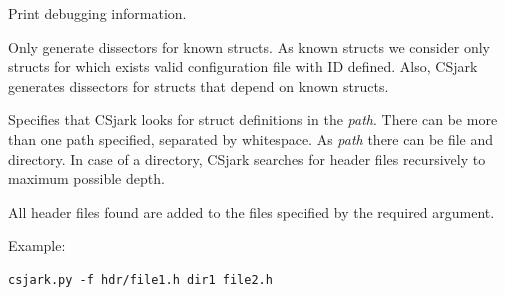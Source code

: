 \documentclass[A4paper,10pt,english]{sphinxmanual}
\begin{document}
\begin{fulllineitems}
\label{user/use:cmdoption-d}
Print debugging information.

\end{fulllineitems}


\begin{fulllineitems}
\label{user/use:cmdoption-s}
Only generate dissectors for known structs. As known structs we consider only structs for which exists valid configuration file with ID defined. Also, CSjark generates dissectors for structs that depend on known structs.

\end{fulllineitems}


\begin{fulllineitems}
\label{user/use:cmdoption-f}
Specifies that CSjark looks for struct definitions in the \emph{path}. There can be more than one path specified, separated by whitespace. As \emph{path} there can be file and directory. In case of a directory, CSjark searches for header files recursively to maximum possible depth.

All header files found are added to the files specified by the required  argument.

Example:

\begin{Verbatim}[commandchars=\\\{\}]
csjark.py -f hdr/file1.h dir1 file2.h
\end{Verbatim}

\end{fulllineitems}

\end{document}
